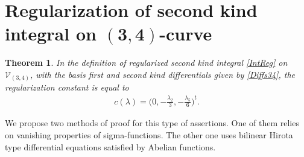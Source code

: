 \documentclass[11pt]{article}
\numberwithin{equation}{section}
\newtheorem{Theorem}{Theorem}[section]
\begin{document}
\section[Regularization of second kind integral on $(3,4)$-curve]{Regularization of second kind integral on $\boldsymbol{(3,4)}$-curve}\label{s:Reg34}
\begin{Theorem}\label{T:Reg34}
In the definition of regularized second kind integral \eqref{IntReg} on $\mathcal{V}_{(3,4)}$, with the basis first and second kind differentials given by \eqref{Diffs34}, the regularization constant is equal to
 \begin{gather}\label{C34const}
 c(\lambda) = \bigg(0, -\frac{\lambda_2}{3}, {-}\frac{\lambda_5}{6} \bigg)^t.
\end{gather}
\end{Theorem}
We propose two methods of proof for this type of assertions. One of them relies on vanishing properties of sigma-functions. The other one uses bilinear Hirota type differential equations satisfied by Abelian functions.
\end{document}
